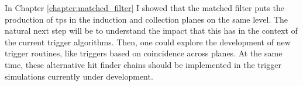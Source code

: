 \begin{comment}
The DAQ system of the \gls{dune} \gls{fd} relies on the online identification of hits on channels, the so-called \gls{tp}s, to form decisions data to store. The goal of Chapter \ref{chapter:matched_filter} is to motivate a method to enhance the production of \gls{tp}s in the induction channels of the detectors. Forming \gls{tp}s from all the charge readout planes will improve the redundancy of the trigger algorithms. Not only that, but this may be the key to have more complex trigger logic that requires directional information. The aspect I focused on to improve the hit finding is the filtering of the waveforms. In section \ref{sec:matched_filter_fir} I use a sample of ProtoDUNE-SP cosmic data to show how different low-pass FIR filters affect the S/N in the collection and induction planes. Then, I introduce the concept of the matched filter in section \ref{sec:matched_filter_matched_filter}. Using the same dataset, I demonstrate that the improvement in the S/N of the induction channels achieved with these filters can be significantly higher than with the standard filter approach. A series of studies using MC samples are presented in section \ref{sec:matched_filter_mc_studies}. These allow to study the dependence of the filtering on the orientation and the energy of the tracks. I also use them to assess the impact of this method on the hit sensitivity. Finally, in section \ref{sec:matched_filter_vdcoldbox} I briefly summarise the results from the VD ColdBox runs which featured the matched filter.

With these studies, I showed that the matched filter puts the production of \gls{tp}s in the induction and collection planes on the same level. The natural next step will be to understand the impact that this has in the context of the current trigger algorithms. Then, explore the development of new trigger routines, like triggers based on coincidence across planes. At the same time, these alternative hit finder chains should be implemented in the trigger simulations currently under development.
\end{comment}

In Chapter \ref{chapter:matched_filter} I showed that the matched filter puts the production of \gls{tp}s in the induction and collection planes on the same level. The natural next step will be to understand the impact that this has in the context of the current trigger algorithms. Then, one could explore the development of new trigger routines, like triggers based on coincidence across planes. At the same time, these alternative hit finder chains should be implemented in the trigger simulations currently under development.

